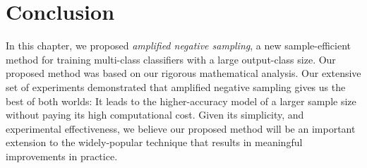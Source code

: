 





\section{Conclusion}
In this chapter, we proposed \emph{amplified negative sampling}, a new sample-efficient method for training multi-class classifiers with a large output-class size. Our proposed method was based on our rigorous mathematical analysis. Our extensive set of experiments demonstrated that amplified negative sampling gives us the best of both worlds: It leads to the higher-accuracy model of a larger sample size without paying its high computational cost. Given its simplicity, and experimental effectiveness, we believe our proposed method will be an important extension to the widely-popular technique that results in meaningful improvements in practice.

\label{sec:NS:conclusion}